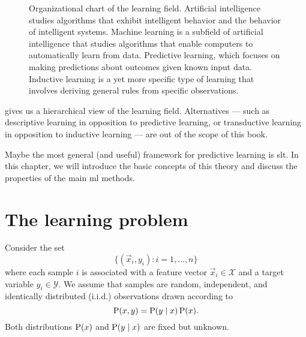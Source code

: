 \begin{figure}
  \centering
  \caption{
  Organizational chart of the learning field.
  Artificial intelligence studies algorithms that exhibit intelligent behavior and the
  behavior of intelligent systems.  Machine learning is a subfield of artificial
  intelligence that studies algorithms that enable computers to automatically learn from
  data.  Predictive learning, which focuses on making predictions about outcomes given
  known input data.  Inductive learning is a yet more specific type of learning that
  involves deriving general rules from specific observations.
  }
  \label{fig:learning}
\end{figure}

 gives us a hierarchical view of the learning field.  Alternatives ---
such as descriptive learning in opposition to predictive learning, or transductive
learning in opposition to inductive learning --- are out of the scope of this book.

Maybe the most general (and useful) framework for predictive learning is \gls{slt}.
In this chapter, we will introduce the basic concepts of this theory and discuss the
properties of the main \gls{ml} methods.

\section{The learning problem}
\label{sec:learning-problem}

Consider the set
\begin{equation}
  \label{eq:training-set}
  \big\{(\vec{x}_i, y_i) : i = 1, \dots, n \big\}
\end{equation}
where each sample $i$ is associated with a feature vector $\vec{x}_i \in \mathcal{X}$ and a target variable
$y_i \in \mathcal{Y}$.  We assume that samples are random, independent, and identically
distributed (i.i.d.) observations drawn according to $$\operatorname{P}(x, y) = \operatorname{P}(y \mid x) \operatorname{P}(x)\text{.}$$
Both distributions $\operatorname{P}(x)$ and $\operatorname{P}(y \mid x)$ are fixed but unknown.

